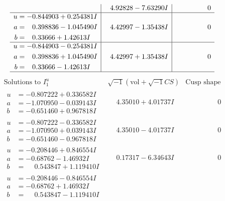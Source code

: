 \documentclass[1p]{elsarticle_modified}
\theoremstyle{definition}
\newcommand{\I}{\sqrt{-1}}
\begin{document}
$$\begin{array}{c|c|c}
 & \phantom{-}4.92828 - 7.63290 I & \phantom{-0.000000 } 0 \\ \hline\begin{aligned}
u &= -0.844903 + 0.254381 I \\
a &= \phantom{-}0.398836 - 1.045490 I \\
b &= \phantom{-}0.33666 + 1.42613 I\end{aligned}
 & \phantom{-}4.42997 - 1.35438 I & \phantom{-0.000000 } 0 \\ \hline\begin{aligned}
u &= -0.844903 - 0.254381 I \\
a &= \phantom{-}0.398836 + 1.045490 I \\
b &= \phantom{-}0.33666 - 1.42613 I\end{aligned}
 & \phantom{-}4.42997 + 1.35438 I & \phantom{-0.000000 } 0\\
 \hline 
 \end{array}$$\newpage$$\begin{array}{c|c|c}  
\text{Solutions to }I^u_{1}& \I (\text{vol} + \sqrt{-1}CS) & \text{Cusp shape}\\
 \hline 
\begin{aligned}
u &= -0.807222 + 0.336582 I \\
a &= -1.070950 - 0.039143 I \\
b &= -0.651460 + 0.967818 I\end{aligned}
 & \phantom{-}4.35010 + 4.01737 I & \phantom{-0.000000 } 0 \\ \hline\begin{aligned}
u &= -0.807222 - 0.336582 I \\
a &= -1.070950 + 0.039143 I \\
b &= -0.651460 - 0.967818 I\end{aligned}
 & \phantom{-}4.35010 - 4.01737 I & \phantom{-0.000000 } 0 \\ \hline\begin{aligned}
u &= -0.208446 + 0.846554 I \\
a &= -0.68762 - 1.46932 I \\
b &= \phantom{-}0.543847 + 1.119410 I\end{aligned}
 & \phantom{-}0.17317 - 6.34643 I & \phantom{-0.000000 } 0 \\ \hline\begin{aligned}
u &= -0.208446 - 0.846554 I \\
a &= -0.68762 + 1.46932 I \\
b &= \phantom{-}0.543847 - 1.119410 I\end{aligned}

\end{array}$$
\end{document}
